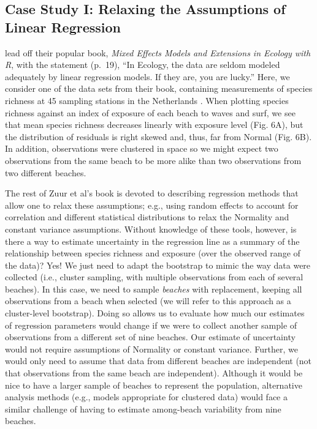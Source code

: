 \documentclass[fleqn,10pt]{wlpeerj} %
\begin{document}
\hypertarget{case-study-i-relaxing-the-assumptions-of-linear-regression}{%
\subsection*{Case Study I: Relaxing the Assumptions of Linear Regression}\label{case-study-i-relaxing-the-assumptions-of-linear-regression}}

\citet{zuur2009mixed} lead off their popular book, \emph{Mixed Effects Models and Extensions in Ecology with R}, with the statement (p.~19), ``In Ecology, the data are seldom modeled adequately by linear regression models. If they are, you are lucky.'' Here, we consider one of the data sets from their book, containing measurements of species richness at 45 sampling stations in the Netherlands \citep[five stations located within each of nine beaches,][]{janssen2004ecologie, janssen2005zonation}. When plotting species richness against an index of exposure of each beach to waves and surf, we see that mean species richness decreases linearly with exposure level (Fig. 6A), but the distribution of residuals is right skewed and, thus, far from Normal (Fig. 6B). In addition, observations were clustered in space so we might expect two observations from the same beach to be more alike than two observations from two different beaches.

The rest of Zuur et al's book is devoted to describing regression methods that allow one to relax these assumptions; e.g., using random effects to account for correlation and different statistical distributions to relax the Normality and constant variance assumptions. Without knowledge of these tools, however, is there a way to estimate uncertainty in the regression line as a summary of the relationship between species richness and exposure (over the observed range of the data)? Yes! We just need to adapt the bootstrap to mimic the way data were collected (i.e., cluster sampling, with multiple observations from each of several beaches). In this case, we need to sample \emph{beaches} with replacement, keeping all observations from a beach when selected (we will refer to this approach as a cluster-level bootstrap). Doing so allows us to evaluate how much our estimates of regression parameters would change if we were to collect another sample of observations from a different set of nine beaches. Our estimate of uncertainty would not require assumptions of Normality or constant variance. Further, we would only need to assume that data from different beaches are independent (not that observations from the same beach are independent). Although it would be nice to have a larger sample of beaches to represent the population, alternative analysis methods (e.g., models appropriate for clustered data) would face a similar challenge of having to estimate among-beach variability from nine beaches.
\end{document}
